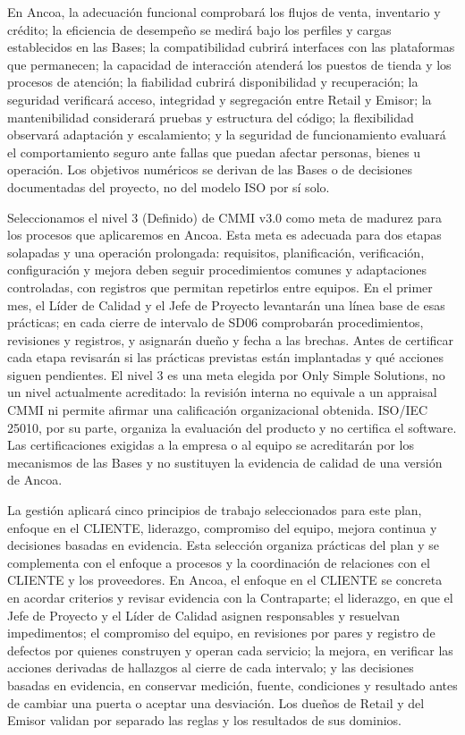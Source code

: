 \documentclass[11pt]{article}
\begin{document}
En Ancoa, la adecuación funcional comprobará los flujos de venta, inventario y crédito; la eficiencia de desempeño se medirá bajo los perfiles y cargas establecidos en las Bases; la compatibilidad cubrirá interfaces con las plataformas que permanecen; la capacidad de interacción atenderá los puestos de tienda y los procesos de atención; la fiabilidad cubrirá disponibilidad y recuperación; la seguridad verificará acceso, integridad y segregación entre Retail y Emisor; la mantenibilidad considerará pruebas y estructura del código; la flexibilidad observará adaptación y escalamiento; y la seguridad de funcionamiento evaluará el comportamiento seguro ante fallas que puedan afectar personas, bienes u operación. Los objetivos numéricos se derivan de las Bases o de decisiones documentadas del proyecto, no del modelo ISO por sí solo.

Seleccionamos el nivel 3 (Definido) de CMMI v3.0 como meta de madurez para los procesos que aplicaremos en Ancoa. Esta meta es adecuada para dos etapas solapadas y una operación prolongada: requisitos, planificación, verificación, configuración y mejora deben seguir procedimientos comunes y adaptaciones controladas, con registros que permitan repetirlos entre equipos. En el primer mes, el Líder de Calidad y el Jefe de Proyecto levantarán una línea base de esas prácticas; en cada cierre de intervalo de SD06 comprobarán procedimientos, revisiones y registros, y asignarán dueño y fecha a las brechas. Antes de certificar cada etapa revisarán si las prácticas previstas están implantadas y qué acciones siguen pendientes. El nivel 3 es una meta elegida por Only Simple Solutions, no un nivel actualmente acreditado: la revisión interna no equivale a un appraisal CMMI ni permite afirmar una calificación organizacional obtenida. ISO/IEC 25010, por su parte, organiza la evaluación del producto y no certifica el software. Las certificaciones exigidas a la empresa o al equipo se acreditarán por los mecanismos de las Bases y no sustituyen la evidencia de calidad de una versión de Ancoa.

La gestión aplicará cinco principios de trabajo seleccionados para este plan, enfoque en el CLIENTE, liderazgo, compromiso del equipo, mejora continua y decisiones basadas en evidencia. Esta selección organiza prácticas del plan y se complementa con el enfoque a procesos y la coordinación de relaciones con el CLIENTE y los proveedores. En Ancoa, el enfoque en el CLIENTE se concreta en acordar criterios y revisar evidencia con la Contraparte; el liderazgo, en que el Jefe de Proyecto y el Líder de Calidad asignen responsables y resuelvan impedimentos; el compromiso del equipo, en revisiones por pares y registro de defectos por quienes construyen y operan cada servicio; la mejora, en verificar las acciones derivadas de hallazgos al cierre de cada intervalo; y las decisiones basadas en evidencia, en conservar medición, fuente, condiciones y resultado antes de cambiar una puerta o aceptar una desviación. Los dueños de Retail y del Emisor validan por separado las reglas y los resultados de sus dominios.
\end{document}
